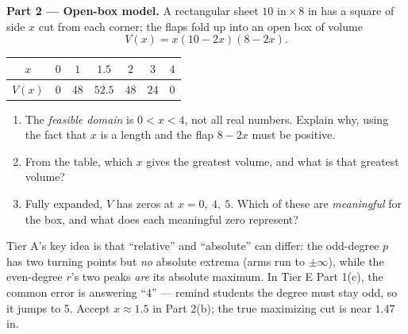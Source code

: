 \documentclass[10pt]{article}
\begin{document}
\begin{tcolorbox}[colback=white, colframe=black!40, title=\textbf{Tier E --- Extension},
    fonttitle=\bfseries, arc=1.5mm, left=3mm, right=3mm, top=2mm, bottom=2mm, breakable]
\vspace{4pt}
\textbf{Part 2 --- Open-box model.} A rectangular sheet $10\text{ in}\times 8\text{ in}$ has a square
of side $x$ cut from each corner; the flaps fold up into an open box of volume
\[
  V(x) = x(10-2x)(8-2x).
\]
\begin{center}
\renewcommand{\arraystretch}{1.25}
\begin{tabular}{|c|c|c|c|c|c|c|}
\hline
$x$ & $0$ & $1$ & $1.5$ & $2$ & $3$ & $4$ \\ \hline
$V(x)$ & $0$ & $48$ & $52.5$ & $48$ & $24$ & $0$ \\ \hline
\end{tabular}
\end{center}
\begin{enumerate}[label=(\alph*), leftmargin=1.8em, itemsep=6pt]
  \item The \emph{feasible domain} is $0<x<4$, not all real numbers. Explain why, using the fact that
        $x$ is a length and the flap $8-2x$ must be positive.
  \item From the table, which $x$ gives the greatest volume, and what is that greatest volume?
  \item Fully expanded, $V$ has zeros at $x=0,\ 4,\ 5$. Which of these are \emph{meaningful} for the
        box, and what does each meaningful zero represent?
\end{enumerate}
\end{tcolorbox}

\begin{teachernote}
Tier A's key idea is that ``relative'' and ``absolute'' can differ: the odd-degree $p$ has two
turning points but \emph{no} absolute extrema (arms run to $\pm\infty$), while the even-degree $r$'s
two peaks \emph{are} its absolute maximum. In Tier E Part 1(c), the common error is answering ``4''
--- remind students the degree must stay odd, so it jumps to 5. Accept $x\approx1.5$ in Part 2(b);
the true maximizing cut is near $1.47$ in.
\end{teachernote}
\end{document}
